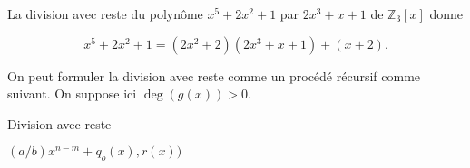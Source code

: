 

\begin{example}
  \label{exe:24}
  La division avec reste du polynôme $x^5+2x^2+1$ par $2x^3+x+1$ de $ℤ_3[x]$ donne

  \begin{displaymath}
    x^5+2x^2+1 = (2x^2 +2) (2x^3 + x +1) + (x+2). 
  \end{displaymath}
  
\end{example}

%
On peut formuler la division avec reste comme un procédé récursif comme suivant. On suppose ici  $\deg(g(x))>0$. 

\begin{algorithm}
  \caption{Division avec reste}\label{euclid}
  \begin{algorithmic}[1]
    \State{}
    \Else
    \State \Return $(a/b) x^{n-m} + q_o(x),r(x))$  
  \EndIf
  \EndProcedure
\end{algorithmic}
\end{algorithm}






